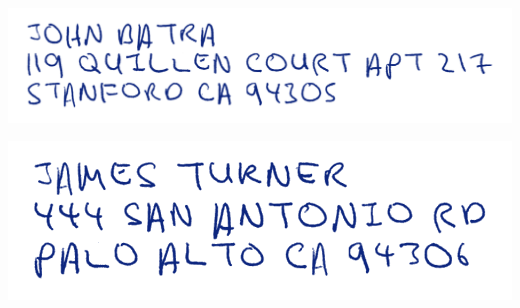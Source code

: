 \documentclass{letter}
\begin{document}
 
\includegraphics[width=0.3\linewidth]{from.png}
 
\vspace{0.7in}\large
\setlength\parindent{3.6in}
 
\begin{center} 
  \includegraphics[width=0.46\linewidth]{to.png}
\end{center} 
 
\end{document}
